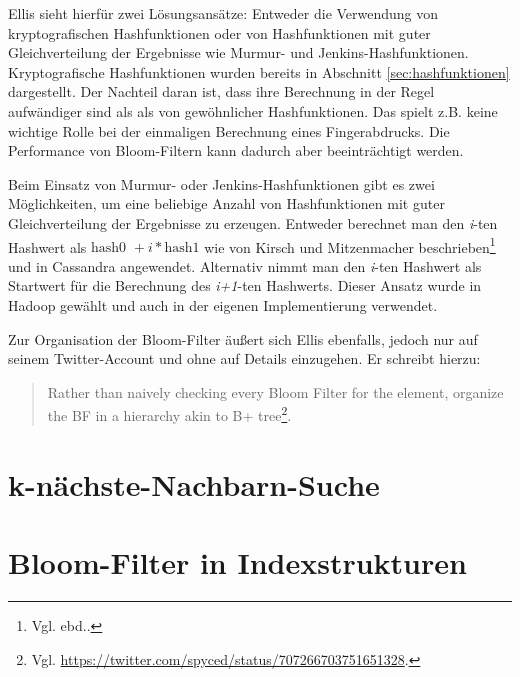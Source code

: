Ellis sieht hierfür zwei Lösungsansätze: Entweder die Verwendung von kryptografischen Hashfunktionen oder von Hashfunktionen mit guter Gleichverteilung der Ergebnisse wie Murmur- und Jenkins-Hashfunktionen. Kryptografische Hashfunktionen wurden bereits in Abschnitt \ref{sec:hashfunktionen} dargestellt. Der Nachteil daran ist, dass ihre Berechnung in der Regel aufwändiger sind als als von gewöhnlicher Hashfunktionen. Das spielt z.B. keine wichtige Rolle bei der einmaligen Berechnung eines Fingerabdrucks. Die Performance von Bloom-Filtern kann dadurch aber beeinträchtigt werden. 

Beim Einsatz von Murmur- oder Jenkins-Hashfunktionen gibt es zwei Möglichkeiten, um eine beliebige Anzahl von Hashfunktionen mit guter Gleichverteilung der Ergebnisse zu erzeugen. Entweder berechnet man den \textit{i}-ten Hashwert als $\text{hash0 }+ i\ast \text{hash1}$ wie von Kirsch und Mitzenmacher beschrieben\footnote{Vgl. ebd..} und in Cassandra angewendet. Alternativ nimmt man den \textit{i}-ten Hashwert als Startwert für die Berechnung des \textit{i+1}-ten Hashwerts. Dieser Ansatz wurde in Hadoop gewählt und auch in der eigenen Implementierung verwendet. 

Zur Organisation der Bloom-Filter äußert sich Ellis ebenfalls, jedoch nur auf seinem Twitter-Account und ohne auf Details einzugehen. Er schreibt hierzu: 
\begin{quote}
Rather than naively checking every Bloom Filter for the element, organize the BF in a hierarchy akin to B+ tree\footnote{Vgl. \url{https://twitter.com/spyced/status/707266703751651328}.}.
\end{quote}
\section{k-nächste-Nachbarn-Suche}
\section{Bloom-Filter in Indexstrukturen}

